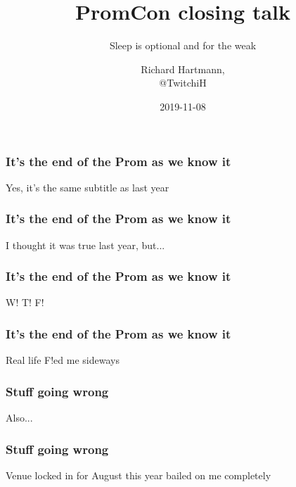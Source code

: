 \documentclass[t]{beamer}
\title{PromCon closing talk}
\subtitle{Sleep is optional and for the weak}
\author{Richard Hartmann,\\
@TwitchiH}
\date{2019-11-08}
\begin{document}
\setcounter{tocdepth}{1}

\begin{frame}
	\titlepage
\end{frame}





\begin{frame}
	\frametitle{It's the end of the Prom as we know it}
	\begin{center}
	\vfill
	Yes, it's the same subtitle as last year
	\vfill
	\end{center}
\end{frame}

\begin{frame}
	\frametitle{It's the end of the Prom as we know it}
	\begin{center}
	\vfill
	I thought it was true last year, but...
	\vfill
	\end{center}
\end{frame}

\begin{frame}
	\frametitle{It's the end of the Prom as we know it}
	\begin{center}
	\vfill
	W! T! F!
	\vfill
	\end{center}
\end{frame}

\begin{frame}
	\frametitle{It's the end of the Prom as we know it}
	\begin{center}
	\vfill
	Real life F!ed me sideways
	\vfill
	\end{center}
\end{frame}



\begin{frame}
	\frametitle{Stuff going wrong}
	\centering
	\vfill
	Also...
	\vfill
\end{frame}

\begin{frame}
	\frametitle{Stuff going wrong}
	\centering
	\vfill
	Venue locked in for August this year bailed on me completely
	\vfill
\end{frame}
\end{document}
